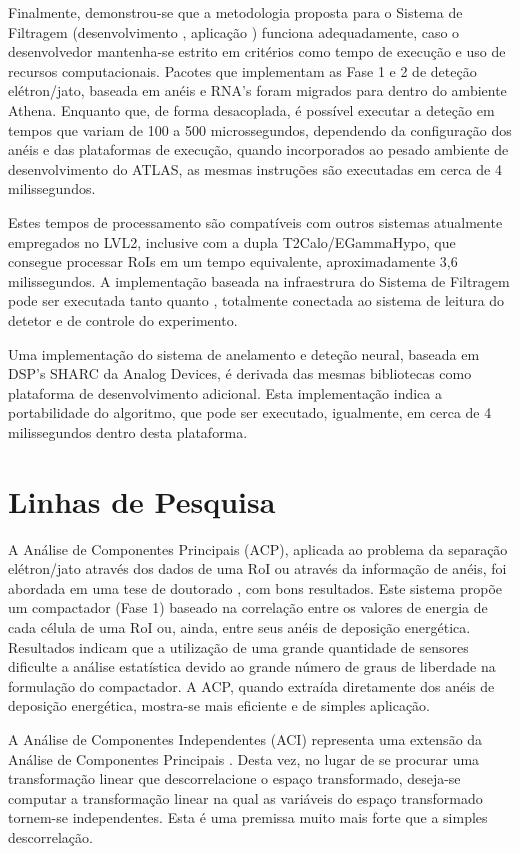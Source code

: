 Finalmente, demonstrou-se que a metodologia proposta para o Sistema de
Filtragem (desenvolvimento , aplicação ) funciona
adequadamente, caso o desenvolvedor mantenha-se estrito em critérios como
tempo de execução e uso de recursos computacionais. Pacotes que implementam as
Fase 1 e 2 de deteção elétron/jato, baseada em anéis e RNA's foram migrados
para dentro do ambiente Athena. Enquanto que, de forma desacoplada, é possível
executar a deteção em tempos que variam de 100 a 500 microssegundos,
dependendo da configuração dos anéis e das plataformas de execução, quando
incorporados ao pesado ambiente de desenvolvimento do ATLAS, as mesmas
instruções são executadas em cerca de 4 milissegundos.

Estes tempos de processamento são compatíveis com outros sistemas atualmente
empregados no LVL2, inclusive com a dupla T2Calo/EGammaHypo, que consegue
processar RoIs em um tempo equivalente, aproximadamente 3,6 milissegundos. A
implementação baseada na infraestrura do Sistema de Filtragem pode ser
executada tanto  quanto , totalmente conectada ao
sistema de leitura do detetor e de controle do experimento.

Uma implementação do sistema de anelamento e deteção neural, baseada em DSP's
SHARC da Analog Devices, é derivada das mesmas bibliotecas como plataforma de
desenvolvimento adicional. Esta implementação indica a portabilidade do
algoritmo, que pode ser executado, igualmente, em cerca de 4 milissegundos
dentro desta plataforma.

\section{Linhas de Pesquisa}

A Análise de Componentes Principais (ACP), aplicada ao problema da separação
elétron/jato através dos dados de uma RoI ou através da informação de anéis,
foi abordada em uma tese de doutorado \cite{herman}, com bons resultados. Este
sistema propõe um compactador (Fase 1) baseado na correlação entre os valores
de energia de cada célula de uma RoI ou, ainda, entre seus anéis de deposição
energética. Resultados indicam que a utilização de uma grande quantidade de
sensores dificulte a análise estatística devido ao grande número de graus de
liberdade na formulação do compactador. A ACP, quando extraída diretamente dos
anéis de deposição energética, mostra-se mais eficiente e de simples
aplicação.

A Análise de Componentes Independentes (ACI) representa uma extensão da
Análise de Componentes Principais \cite{oja-ica}. Desta vez, no lugar de se
procurar uma transformação linear que descorrelacione o espaço transformado,
deseja-se computar a transformação linear na qual as variáveis do espaço
transformado tornem-se independentes. Esta é uma premissa muito mais forte que
a simples descorrelação.

